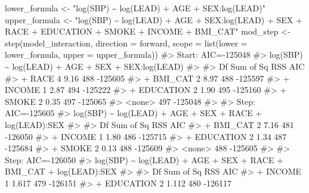 \documentclass[
  letterpaper,
]{krantz}
\makeatletter
\newenvironment{Shaded}{\begin{snugshade}}{\end{snugshade}}
\newcommand{\AttributeTok}[1]{\textcolor[rgb]{0.40,0.45,0.13}{#1}}
\newcommand{\CommentTok}[1]{\textcolor[rgb]{0.37,0.37,0.37}{#1}}
\newcommand{\FunctionTok}[1]{\textcolor[rgb]{0.28,0.35,0.67}{#1}}
\newcommand{\NormalTok}[1]{\textcolor[rgb]{0.00,0.23,0.31}{#1}}
\newcommand{\OtherTok}[1]{\textcolor[rgb]{0.00,0.23,0.31}{#1}}
\newcommand{\StringTok}[1]{\textcolor[rgb]{0.13,0.47,0.30}{#1}}
\newenvironment{kframe}{%
\medskip{}
\setlength{\fboxsep}{.8em}
 \def\at@end@of@kframe{}%
 \ifinner\ifhmode%
  \def\at@end@of@kframe{\end{minipage}}%
  \begin{minipage}{\columnwidth}%
 \fi\fi%
 \def\FrameCommand##1{\hskip\@totalleftmargin \hskip-\fboxsep
 \colorbox{shadecolor}{##1}\hskip-\fboxsep
     \hskip-\linewidth \hskip-\@totalleftmargin \hskip\columnwidth}%
 \MakeFramed {\advance\hsize-\width
   \@totalleftmargin\z@ \linewidth\hsize
   \@setminipage}}%
 {\par\unskip\endMakeFramed%
 \at@end@of@kframe}
\renewenvironment{Shaded}{\begin{kframe}}{\end{kframe}}
\makeatother
\begin{document}
\begin{Shaded}
\begin{Highlighting}[]
\NormalTok{lower\_formula }\OtherTok{\textless{}{-}} \StringTok{"log(SBP) \textasciitilde{} log(LEAD) + AGE + SEX:log(LEAD)"}
\NormalTok{upper\_formula }\OtherTok{\textless{}{-}} \StringTok{"log(SBP) \textasciitilde{} log(LEAD) + AGE + SEX:log(LEAD) + SEX + }
\StringTok{  RACE + EDUCATION + SMOKE + INCOME + BMI\_CAT"}
\NormalTok{mod\_step }\OtherTok{\textless{}{-}} \FunctionTok{step}\NormalTok{(model\_interaction, }\AttributeTok{direction =} \StringTok{\textquotesingle{}forward\textquotesingle{}}\NormalTok{, }
                 \AttributeTok{scope =} \FunctionTok{list}\NormalTok{(}\AttributeTok{lower =}\NormalTok{ lower\_formula, }
                              \AttributeTok{upper =}\NormalTok{ upper\_formula))}
\CommentTok{\#\textgreater{} Start:  AIC={-}125048}
\CommentTok{\#\textgreater{} log(SBP) \textasciitilde{} log(LEAD) + AGE + SEX + SEX:log(LEAD)}
\CommentTok{\#\textgreater{} }
\CommentTok{\#\textgreater{}             Df Sum of Sq RSS     AIC}
\CommentTok{\#\textgreater{} + RACE       4      9.16 488 {-}125605}
\CommentTok{\#\textgreater{} + BMI\_CAT    2      8.97 488 {-}125597}
\CommentTok{\#\textgreater{} + INCOME     1      2.87 494 {-}125222}
\CommentTok{\#\textgreater{} + EDUCATION  2      1.90 495 {-}125160}
\CommentTok{\#\textgreater{} + SMOKE      2      0.35 497 {-}125065}
\CommentTok{\#\textgreater{} \textless{}none\textgreater{}                   497 {-}125048}
\CommentTok{\#\textgreater{} }
\CommentTok{\#\textgreater{} Step:  AIC={-}125605}
\CommentTok{\#\textgreater{} log(SBP) \textasciitilde{} log(LEAD) + AGE + SEX + RACE + log(LEAD):SEX}
\CommentTok{\#\textgreater{} }
\CommentTok{\#\textgreater{}             Df Sum of Sq RSS     AIC}
\CommentTok{\#\textgreater{} + BMI\_CAT    2      7.16 481 {-}126050}
\CommentTok{\#\textgreater{} + INCOME     1      1.80 486 {-}125715}
\CommentTok{\#\textgreater{} + EDUCATION  2      1.34 487 {-}125684}
\CommentTok{\#\textgreater{} + SMOKE      2      0.13 488 {-}125609}
\CommentTok{\#\textgreater{} \textless{}none\textgreater{}                   488 {-}125605}
\CommentTok{\#\textgreater{} }
\CommentTok{\#\textgreater{} Step:  AIC={-}126050}
\CommentTok{\#\textgreater{} log(SBP) \textasciitilde{} log(LEAD) + AGE + SEX + RACE + BMI\_CAT + log(LEAD):SEX}
\CommentTok{\#\textgreater{} }
\CommentTok{\#\textgreater{}             Df Sum of Sq RSS     AIC}
\CommentTok{\#\textgreater{} + INCOME     1     1.617 479 {-}126151}
\CommentTok{\#\textgreater{} + EDUCATION  2     1.112 480 {-}126117}

\end{Highlighting}
\end{Shaded}
\end{document}
